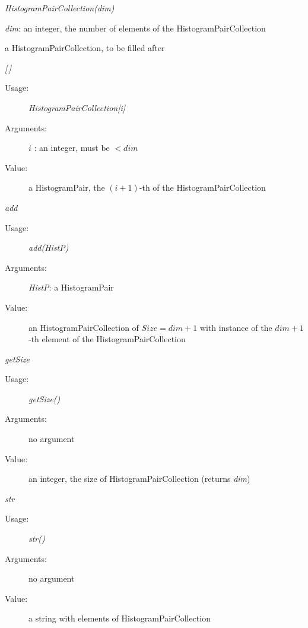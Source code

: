 \begin{description}

\item[Usage:] \textit{HistogramPairCollection(dim)}

\item[Arguments:]  \textit{dim}: an integer, the number of elements of the HistogramPairCollection

\item[Value:] a HistogramPairCollection, to be filled after

\item[Some methods :]  \rule{0pt}{1em}

\begin{description}

\item \textit{[\,]}
\begin{description}
\item[Usage:] \textit{HistogramPairCollection[i]}
\item[Arguments:] $i$ : an integer, must be $<dim$
\item[Value:] a HistogramPair, the $(i+1)$-th of the HistogramPairCollection
\end{description}


\item \textit{add}
\begin{description}
\item[Usage:] \textit{add(HistP)}
\item[Arguments:] \textit{HistP}: a HistogramPair
\item[Value:]        an HistogramPairCollection of $Size = dim +1$
with instance of the $dim +1$-th element of the HistogramPairCollection
\end{description}

\item \textit{getSize}
\begin{description}
\item[Usage:] \textit{getSize()}
\item[Arguments:] no argument
\item[Value:]    an integer, the size of HistogramPairCollection (returns \textit{dim})
\end{description}

\item \textit{str}
\begin{description}
\item[Usage:] \textit{str()}
\item[Arguments:] no argument
\item[Value:]      a string with elements of HistogramPairCollection
\end{description}

\end{description}

\end{description}


